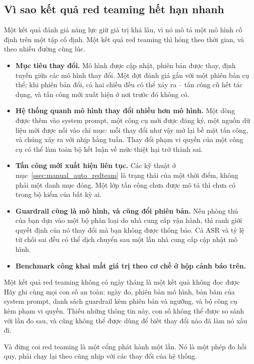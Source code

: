 \subsection{Vì sao kết quả red teaming hết hạn nhanh}
\label{ssec:redteam_expiry}

Một kết quả đánh giá năng lực giữ giá trị khá lâu, vì nó mô tả một mô hình cố định trên một tập cố định. Một kết quả red teaming thì hỏng theo thời gian, và theo nhiều đường cùng lúc.

\begin{itemize}
	\item \textbf{Mục tiêu thay đổi.} Mô hình được cập nhật, phiên bản được thay, định tuyến giữa các mô hình thay đổi. Một đợt đánh giá gắn với một phiên bản cụ thể; khi phiên bản đổi, cả hai chiều đều có thể xảy ra -- tấn công cũ hết tác dụng, và tấn công mới xuất hiện ở nơi trước đó không có.
	\item \textbf{Hệ thống quanh mô hình thay đổi nhiều hơn mô hình.} Một dòng được thêm vào system prompt, một công cụ mới được đăng ký, một nguồn dữ liệu mới được nối vào chỉ mục: mỗi thay đổi như vậy mở lại bề mặt tấn công, và chúng xảy ra với nhịp hằng tuần. Thay đổi phạm vi quyền của một công cụ có thể làm toàn bộ kết luận về mức thiệt hại trở thành sai.
	\item \textbf{Tấn công mới xuất hiện liên tục.} Các kỹ thuật ở mục~\ref{ssec:manual_auto_redteam} là trạng thái của một thời điểm, không phải một danh mục đóng. Một lớp tấn công chưa được mô tả thì chưa có trong bộ kiểm của bất kỳ ai.
	\item \textbf{Guardrail cũng là mô hình, và cũng đổi phiên bản.} Nếu phòng thủ của bạn dựa vào một bộ phân loại do nhà cung cấp vận hành, thì ranh giới quyết định của nó thay đổi mà bạn không được thông báo. Cả ASR và tỷ lệ từ chối sai đều có thể dịch chuyển sau một lần nhà cung cấp cập nhật mô hình.
	\item \textbf{Benchmark công khai mất giá trị theo cơ chế ở hộp cảnh báo trên.}
\end{itemize}

\begin{pitfall}{Một kết quả red teaming không có ngày tháng là một kết quả không đọc được}
Hãy ghi cùng mọi con số an toàn: ngày đo, phiên bản mô hình, bản băm của system prompt, danh sách guardrail kèm phiên bản và ngưỡng, và bộ công cụ kèm phạm vi quyền. Thiếu những thông tin này, con số không thể được so sánh với lần đo sau, và cũng không thể được dùng để biết thay đổi nào đã làm nó xấu đi.

Và đừng coi red teaming là một cổng phát hành một lần. Nó là một phép đo hồi quy, phải chạy lại theo cùng nhịp với các thay đổi của hệ thống.
\end{pitfall}

